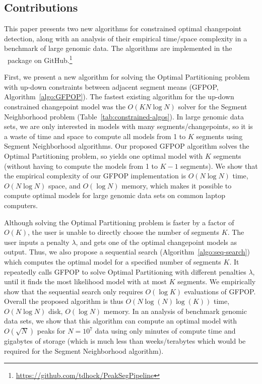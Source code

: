 \documentclass[article]{jss}
\newcommand{\R}{\proglang{R}}
\begin{document}


\subsection{Contributions}

This paper presents two new algorithms for constrained optimal
changepoint detection, along with an analysis of their empirical
time/space complexity in a benchmark of large genomic data. The
algorithms are implemented in the \R\ package
 on GitHub.\footnote{
\url{https://github.com/tdhock/PeakSegPipeline}
}

First, we present a new algorithm for solving the Optimal Partitioning
problem with up-down constraints between adjacent segment means
(GFPOP, Algorithm~\ref{algo:GFPOP}). The fastest existing algorithm
for the up-down constrained changepoint model was the
$O(KN\log N)$ solver for the Segment Neighborhood problem
(Table~\ref{tab:constrained-algos}). In large genomic data sets, we
are only interested in models with many segments/changepoints, so it
is a waste of time and space to compute all models from 1 to $K$
segments using Segment Neighborhood algorithms. Our proposed GFPOP
algorithm solves the Optimal Partitioning problem, so yields one
optimal model with $K$ segments (without having to compute the models
from 1 to $K-1$ segments). We show that the empirical complexity of
our GFPOP implementation is $O(N\log N)$ time, $O(N\log N)$ space, and
$O(\log N)$ memory, which makes it possible to compute optimal models
for large genomic data sets on common laptop computers.

Although solving the Optimal Partitioning problem is faster by a
factor of $O(K)$, the user is unable to directly choose the number of
segments $K$. The user inputs a penalty $\lambda$, and gets one of the
optimal changepoint models as output. Thus, we also propose a
sequential search (Algorithm~\ref{algo:seq-search}) which computes the
optimal model for a specified number of segments $K$. It repeatedly
calls GFPOP to solve Optimal Partitioning with different penalties
$\lambda$, until it finds the most likelihood model with at most $K$
segments. We empirically show that the sequential search only requires
$O(\log K)$ evaluations of GFPOP. Overall the proposed algorithm is
thus $O( N \log(N)\log(K))$ time, $O(N\log N)$ disk, $O(\log N)$
memory. In an analysis of benchmark genomic data sets, we show that
this algorithm can compute an optimal model with $O(\sqrt N)$ peaks
for $N=10^7$ data using only minutes of compute time and gigabytes of
storage (which is much less than weeks/terabytes which would be
required for the Segment Neighborhood algorithm). 
\end{document}
